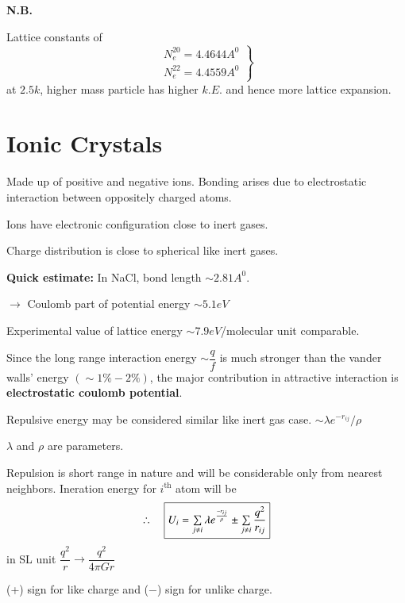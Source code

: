 \bigskip

\noindent
{\bf N.B.}

Lattice constants of
$$
\left.
\begin{array}{l}
N_{e}^{20}=4.4644A^{0}\\[3pt]
N_{e}^{22}=4.4559A^{0}
\end{array}
\right\}
$$
at $2.5k$, higher mass particle has higher $k.E$. and hence more lattice expansion.

\eject

\section*{Ionic Crystals}

Made up of positive and negative ions. Bonding arises due to electrostatic interaction between oppositely charged atoms.

Ions have electronic configuration close to inert gases.

Charge distribution is close to spherical like inert gases.

\noindent
{\bf Quick estimate:} In NaCl, bond length $\sim 2.81A^{0}$.

$\to$ Coulomb part of potential energy $\sim 5.1 eV$

Experimental value of lattice energy $\sim 7.9 eV$/molecular unit comparable.

Since the long range interaction energy $\sim \dfrac{q}{f}$ is much stronger than the vander walls' energy $(\sim 1\%-2\%)$, the major contribution in attractive interaction is {\bf electrostatic coulomb potential}.

Repulsive energy may be considered similar like inert gas case. $\sim \lambda e^{-r_{ij}}/\rho$ 

$\lambda$ and $\rho$ are parameters.

Repulsion is short range in nature and will be considerable only from nearest neighbors. Ineration energy for $i^{\text{th}}$ atom will be
$$
\therefore\quad \fbox{$U_{i}=\sum\limits_{j\neq i}\lambda e^{\frac{-r_{ij}}{\rho}}\pm \sum\limits_{j\neq i}\dfrac{q^{2}}{r_{ij}}$}
$$
in SL unit $\dfrac{q^{2}}{r}\to \dfrac{q^{2}}{4\pi Gr}$

(+) sign for like charge and ($-$) sign for unlike charge.

